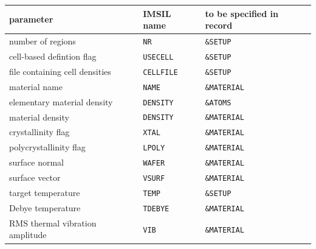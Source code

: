 \begin{center}
\begin{tabular}{lll}
parameter \quad                 & IMSIL name    & to be specified in record \\
\hline
number of regions               & \texttt{NR}        & \texttt{\&SETUP} \\
cell-based defintion flag       & \texttt{USECELL}   & \texttt{\&SETUP} \\
file containing cell densities  & \texttt{CELLFILE}  & \texttt{\&SETUP} \\
material name                   & \texttt{NAME}      & \texttt{\&MATERIAL} \\
elementary material density     & \texttt{DENSITY}   & \texttt{\&ATOMS} \\
material density                & \texttt{DENSITY}   & \texttt{\&MATERIAL} \\
crystallinity flag              & \texttt{XTAL}      & \texttt{\&MATERIAL} \\
polycrystallinity flag          & \texttt{LPOLY}     & \texttt{\&MATERIAL} \\
surface normal                  & \texttt{WAFER}     & \texttt{\&MATERIAL} \\
surface vector                  & \texttt{VSURF}     & \texttt{\&MATERIAL} \\
target temperature              & \texttt{TEMP}      & \texttt{\&SETUP} \\
Debye temperature               & \texttt{TDEBYE}    & \texttt{\&MATERIAL} \\
RMS thermal vibration amplitude & \texttt{VIB}       & \texttt{\&MATERIAL} \\

\end{tabular}
\end{center}

